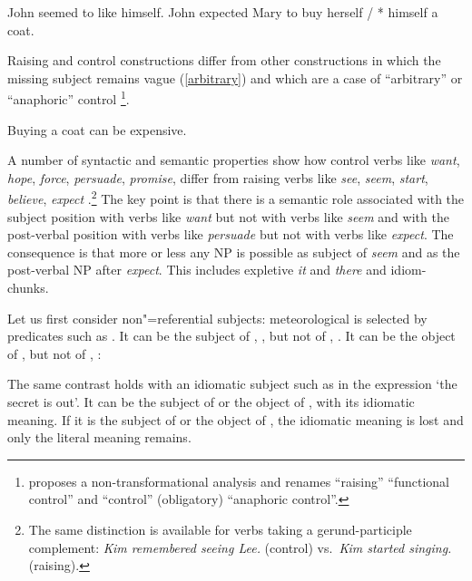 \documentclass[output=paper
	        ,collection
	        ,collectionchapter
 	        ,biblatex
                ,babelshorthands
                ,newtxmath
                ,draftmode
                ,colorlinks, citecolor=brown
]{langscibook}
\begin{document}
\eal
\ex John seemed to like himself.\label{seem}
\ex John expected Mary to buy herself / * himself a coat. \label{exp}
\zl
 
Raising and control constructions differ from other constructions in which the missing subject
remains vague (\ref{arbitrary}) and which are a case of ``arbitrary'' or ``anaphoric'' control
\parencites[--76]{Chomsky1981}[]{Bresnan1982}\footnote{\citet{Bresnan1982} proposes
  a non-transformational analysis and renames ``raising'' ``functional control'' and ``control''
  (obligatory) ``anaphoric control''.%
}. 
 
\ea
Buying a coat can be expensive.\label{arbitrary}
\z
  
A number of syntactic and semantic properties show how control verbs like \emph{want}, \emph{hope},
\emph{force}, \emph{persuade}, \emph{promise}, differ from raising verbs like \emph{see},
\emph{seem}, \emph{start}, \emph{believe}, \emph{expect} \citep{Rosenbaum67a-u,Postal1974,Bresnan1982}.\footnote{%
  The same distinction is available for verbs taking a gerund-participle complement: 
  \emph{Kim remembered seeing Lee.} (control) vs.\  \emph{Kim started singing.} (raising).%
}
The key point is that there is a semantic role associated with the subject position with verbs like
\emph{want} but not with verbs like \emph{seem} and with the post-verbal position with verbs like
\emph{persuade} but not with verbs like \emph{expect}.  The consequence is that more or less any NP
is possible as subject of \emph{seem} and as the post-verbal NP after \emph{expect}. This includes
expletive \emph{it} and \emph{there} and idiom-chunks.

Let us first consider non"=referential subjects: meteorological  is selected by predicates
such as . It can be the subject of , , but not of ,
. It can be the object of ,  but not of ,
:
	
\eal
{}
 \label{rain1}
 \label{rain2}
\zl
\eal
{} \label{rain3}
 \label{rain4}
\zl
 	
The same contrast holds with an idiomatic subject such as  in the expression  `the secret is out'. It can be the subject of  or the object of
, with its idiomatic meaning. If it is the subject of  or the object of
, the idiomatic meaning is lost and only the literal meaning remains. 
 
\end{document}

